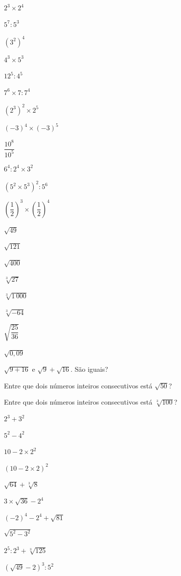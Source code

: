 \documentclass[12pt]{article}
\begin{document}
\begin{exercicios}
  \item $2^3 \times 2^4$
  \item $5^7 : 5^3$
  \item $(3^2)^4$
  \item $4^3 \times 5^3$
  \item $12^5 : 4^5$
  \item $7^6 \times 7 : 7^4$
  \item $(2^3)^2 \times 2^5$
  \item $(-3)^4 \times (-3)^5$
  \item $\dfrac{10^8}{10^5}$
  \item $6^4 : 2^4 \times 3^2$
  \item $(5^2 \times 5^3)^2 : 5^6$
  \item $\left(\dfrac{1}{2}\right)^3 \times \left(\dfrac{1}{2}\right)^4$
\end{exercicios}

\begin{exercicios}
  \item $\sqrt{49}$
  \item $\sqrt{121}$
  \item $\sqrt{400}$
  \item $\sqrt[3]{27}$
  \item $\sqrt[3]{1\,000}$
  \item $\sqrt[3]{-64}$
  \item $\sqrt{\dfrac{25}{36}}$
  \item $\sqrt{0{,}09}$
  \item $\sqrt{9 + 16}$ \quad e \quad $\sqrt{9} + \sqrt{16}$. São iguais?
  \item Entre que dois números inteiros consecutivos está $\sqrt{50}$?
  \item Entre que dois números inteiros consecutivos está $\sqrt[3]{100}$?
\end{exercicios}

\begin{exercicios}
  \item $2^3 + 3^2$
  \item $5^2 - 4^2$
  \item $10 - 2 \times 2^2$
  \item $(10 - 2 \times 2)^2$
  \item $\sqrt{64} + \sqrt[3]{8}$
  \item $3 \times \sqrt{36} - 2^4$
  \item $(-2)^4 - 2^4 + \sqrt{81}$
  \item $\sqrt{5^2 - 3^2}$
  \item $2^5 : 2^3 + \sqrt[3]{125}$
  \item $\left(\sqrt{49} - 2\right)^3 : 5^2$
\end{exercicios}
\end{document}
